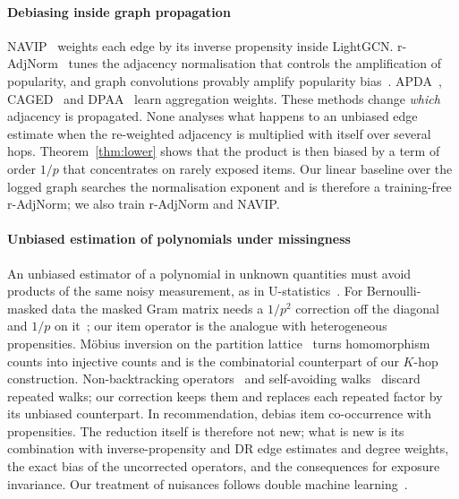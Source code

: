 \documentclass[preprint,review,12pt,authoryear]{elsarticle}
\theoremstyle{definition}
\begin{document}
\paragraph{Debiasing inside graph propagation}
NAVIP~\citep{kim2022navip} weights each edge by its inverse propensity inside
LightGCN. r-AdjNorm~\citep{zhao2022radjnorm} tunes the adjacency normalisation
that controls the amplification of popularity, and graph convolutions provably
amplify popularity bias~\citep{chen2024gcnpop}. APDA~\citep{zhou2023apda},
CAGED~\citep{que2025caged} and DPAA~\citep{dpaa2026} learn aggregation weights.
These methods change \emph{which} adjacency is propagated. None analyses what
happens to an unbiased edge estimate when the re-weighted adjacency is multiplied
with itself over several hops. Theorem~\ref{thm:lower} shows that the product is
then biased by a term of order $1/p$ that concentrates on rarely exposed items.
Our linear baseline over the logged graph searches the normalisation exponent and
is therefore a training-free r-AdjNorm; we also train r-AdjNorm and NAVIP.

\paragraph{Unbiased estimation of polynomials under missingness}
An unbiased estimator of a polynomial in unknown quantities must avoid products of
the same noisy measurement, as in U-statistics~\citep{hoeffding1948}. For
Bernoulli-masked data the masked Gram matrix needs a $1/p^2$ correction off the
diagonal and $1/p$ on it~\citep{lounici2014}; our item operator is the analogue
with heterogeneous propensities. Möbius inversion on the partition
lattice~\citep{rota1964} turns homomorphism counts into injective counts and is
the combinatorial counterpart of our $K$-hop construction. Non-backtracking
operators~\citep{krzakala2013} and self-avoiding walks~\citep{hopkins2017bayesian}
discard repeated walks; our correction keeps them and replaces each repeated
factor by its unbiased counterpart. In recommendation,
\citet{schnabel2020item} debias item co-occurrence with propensities. The
reduction itself is therefore not new; what is new is its combination with
inverse-propensity and DR edge estimates and degree weights, the exact bias of the
uncorrected operators, and the consequences for exposure invariance. Our
treatment of nuisances follows double machine learning~\citep{chernozhukov2018dml}.
\end{document}
